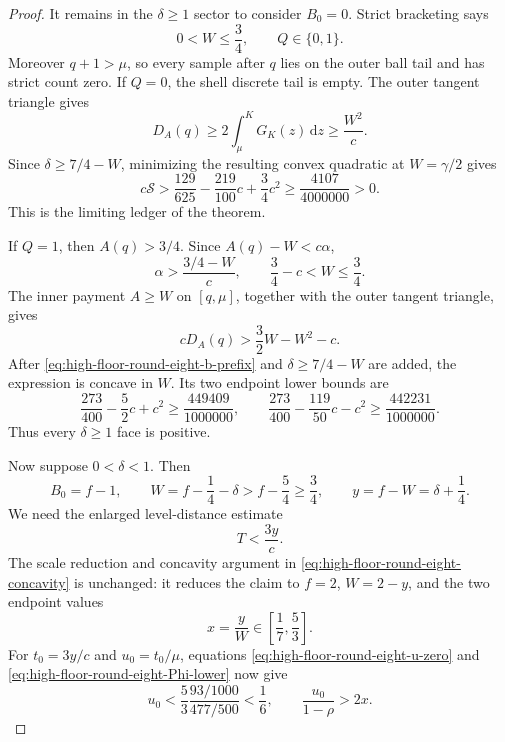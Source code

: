 \documentclass[11pt]{article}
\theoremstyle{remark}
\newcommand{\dd}{\,\mathrm d}
\begin{document}
\begin{proof}
It remains in the $\delta\geq1$ sector to consider $B_0=0$.  Strict
bracketing says
\[
 0<W\leq\frac34,\qquad Q\in\{0,1\}.
\]
Moreover $q+1>\mu$, so every sample after $q$ lies on the outer ball
tail and has strict count zero.  If $Q=0$, the shell discrete tail is
empty.  The outer tangent triangle gives
\[
 D_A(q)\geq2\int_\mu^K G_K(z)\dd z\geq\frac{W^2}{c}.
\]
Since $\delta\geq7/4-W$, minimizing the resulting convex quadratic at
$W=\gamma/2$ gives
\begin{equation}
 c\mathcal S>
 \frac{129}{625}-\frac{219}{100}c+\frac34c^2
 \geq\frac{4107}{4000000}>0.
 \label{eq:high-floor-round-eight-b-zero-count}
\end{equation}
This is the limiting ledger of the theorem.

If $Q=1$, then $A(q)>3/4$.  Since $A(q)-W<c\alpha$,
\[
 \alpha>\frac{3/4-W}{c},\qquad
 \frac34-c<W\leq\frac34.
\]
The inner payment $A\geq W$ on $[q,\mu]$, together with the outer
tangent triangle, gives
\[
 cD_A(q)>\frac32W-W^2-c.
\]
After \eqref{eq:high-floor-round-eight-b-prefix} and
$\delta\geq7/4-W$ are added, the expression is concave in $W$.
Its two endpoint lower bounds are
\begin{equation}
 \frac{273}{400}-\frac52c+c^2
 \geq\frac{449409}{1000000},\qquad
 \frac{273}{400}-\frac{119}{50}c-c^2
 \geq\frac{442231}{1000000}.
 \label{eq:high-floor-round-eight-b-one-count}
\end{equation}
Thus every $\delta\geq1$ face is positive.

Now suppose $0<\delta<1$.  Then
\[
 B_0=f-1,\qquad W=f-\frac14-\delta>f-\frac54\geq\frac34,
 \qquad y=f-W=\delta+\frac14.
\]
We need the enlarged level-distance estimate
\begin{equation}
 \boxed{T<\frac{3y}{c}.}
 \label{eq:high-floor-round-eight-b-level-distance}
\end{equation}
The scale reduction and concavity argument in
\eqref{eq:high-floor-round-eight-concavity} is unchanged: it reduces the
claim to $f=2$, $W=2-y$, and the two endpoint values
\[
 x=\frac yW\in\left[\frac17,\frac53\right].
\]
For $t_0=3y/c$ and $u_0=t_0/\mu$, equations
\eqref{eq:high-floor-round-eight-u-zero} and
\eqref{eq:high-floor-round-eight-Phi-lower} now give
\[
 u_0<\frac53\frac{93/1000}{477/500}<\frac16,
 \qquad \frac{u_0}{1-\rho}>2x.
\]


\end{proof}
\end{document}
